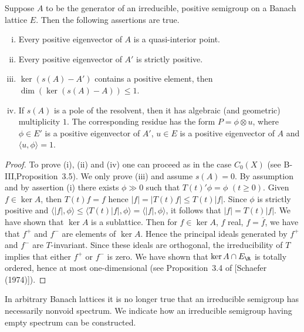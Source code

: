 \begin{proposition}\label{prop:c3-3.5}
	
	Suppose $A$ to be the generator of an irreducible, positive semigroup on a Banach lattice $E$.
	Then the following assertions are true.
	\begin{enumerate}[(i), wide]
	\item 
	Every positive eigenvector of $A$ is a quasi-interior point.
	
	\item 
	Every positive eigenvector of $A'$ is strictly positive.
	
	\item 
	$\ker(s(A) - A')$ contains a positive element, then $\dim(\ker(s(A) - A)) \leq 1$.
	
	\item If $s(A)$ is a pole of the resolvent, then it has algebraic (and geometric) multiplicity $1$.
	The corresponding residue has the form $P = \phi\otimes u$, where $\phi \in E'$ is a positive eigenvector of $A'$, $u \in E$ is a positive eigenvector of $A$ and $\langle u,\phi \rangle = 1$.
	\end{enumerate}
\end{proposition}
	\begin{proof}
		To prove (i), (ii) and (iv) one can proceed as in the case $C_{0}(X)$ (see B-III,Proposition~3.5).
		We only prove (iii) and assume $s(A) = 0$.
		By assumption and by assertion (i) there exists $\phi \gg 0$ such that $T(t)'\phi = \phi$ $(t\geq0)$.
		Given $f \in \ker A$, then $T(t)f = f$ hence $|f| = |T(t)f| \leq T(t)|f|$.
		Since $\phi$ is strictly positive and $\langle|f|,\phi\rangle \leq \langle T(t)|f|,\phi\rangle = \langle|f|,\phi\rangle$, it follows that $|f| = T(t)|f|$.
		We have shown that $\ker A$ is a sublattice.
		Then for $f \in \ker A$, $f$ real, \ie  $f = \overline{f}$, we have that $f^{+}$ and $f^{-}$ are elements of $\ker A$.
		Hence the principal ideals generated by $f^{+}$ and $f^{-}$ are $T$-invariant.
		Since these ideals are orthogonal, the irreducibility of $T$ implies that either $f^{+}$ or $f^{-}$ is zero.
%
		We have shown that $\ker A \cap E_{\R }$ is totally ordered, hence at most one-dimensional (see Proposition~3.4 of [Schaefer (1974)]).
	\end{proof}

In arbitrary Banach lattices it is no longer true that an irreducible semigroup has necessarily nonvoid spectrum.
We indicate how an irreducible semigroup having empty spectrum can be constructed.

